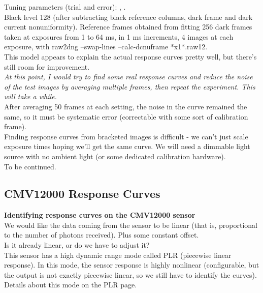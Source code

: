 Tuning parameters (trial and error): , .\\

Black level 128 (after subtracting black reference columns, dark frame and dark current nonuniformity). Reference frames obtained from fitting 256 dark frames taken at exposures from 1 to 64 ms, in 1 ms increments, 4 images at each exposure, with raw2dng --swap-lines --calc-dcnuframe *x1*.raw12.\\

This model appears to explain the actual response curves pretty well, but there's still room for improvement. \\

\textit{At this point, I would try to find some real response curves and reduce the noise of the test images by averaging multiple frames, then repeat the experiment. This will take a while.}\\

After averaging 50 frames at each setting, the noise in the curve remained the same, so it must be systematic error (correctable with some sort of calibration frame).\\

Finding response curves from bracketed images is difficult - we can't just scale exposure times hoping we'll get the same curve. We will need a dimmable light source with no ambient light (or some dedicated calibration hardware).\\


To be continued. 








\subsection{CMV12000 Response Curves}

\textbf{Identifying response curves on the CMV12000 sensor }\\

We would like the data coming from the sensor to be linear (that is, proportional to the number of photons received). Plus some constant offset.\\

Is it already linear, or do we have to adjust it?\\

This sensor has a high dynamic range mode called PLR (piecewise linear response). In this mode, the sensor response is highly nonlinear (configurable, but the output is not exactly piecewise linear, so we still have to identify the curves). Details about this mode on the PLR page.\\

